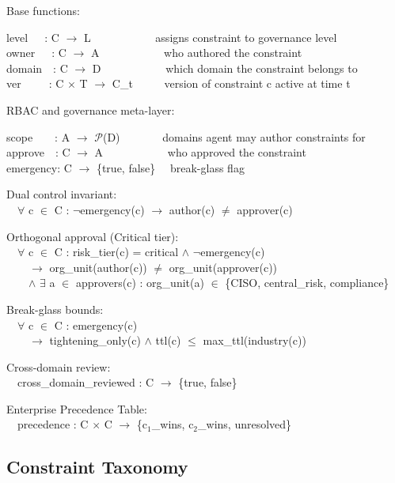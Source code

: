 Base functions:
\begin{cladnote}
level~~~: C $\to$ L~~~~~~~~~~~\textemdash{} assigns constraint to governance level\\
owner~~~: C $\to$ A~~~~~~~~~~~\textemdash{} who authored the constraint\\
domain~~: C $\to$ D~~~~~~~~~~~\textemdash{} which domain the constraint belongs to\\
ver~~~~~: C $\times$ T $\to$ C\_t~~~~~\textemdash{} version of constraint c active at time t
\end{cladnote}


RBAC and governance meta-layer:
\begin{cladnote}
scope~~~~: A $\to$ $\mathcal{P}$(D)~~~~~~~\textemdash{} domains agent may author constraints for\\
approve~~: C $\to$ A~~~~~~~~~~~\textemdash{} who approved the constraint\\
emergency: C $\to$ \{true, false\}~~\textemdash{} break-glass flag
\par\smallskip
Dual control invariant:\\
~~$\forall$ c $\in$ C : $\neg$emergency(c) $\to$ author(c) $\neq$ approver(c)
\par\smallskip
Orthogonal approval (Critical tier):\\
~~$\forall$ c $\in$ C : risk\_tier(c) = critical $\wedge$ $\neg$emergency(c)\\
~~~~$\to$ org\_unit(author(c)) $\neq$ org\_unit(approver(c))\\
~~~~$\wedge$ $\exists$ a $\in$ approvers(c) : org\_unit(a) $\in$ \{CISO, central\_risk, compliance\}
\par\smallskip
Break-glass bounds:\\
~~$\forall$ c $\in$ C : emergency(c)\\
~~~~$\to$ tightening\_only(c) $\wedge$ ttl(c) $\leq$ max\_ttl(industry(c))
\par\smallskip
Cross-domain review:\\
~~cross\_domain\_reviewed : C $\to$ \{true, false\}
\par\smallskip
Enterprise Precedence Table:\\
~~precedence : C $\times$ C $\to$ \{c$_1$\_wins, c$_2$\_wins, unresolved\}
\end{cladnote}


\subsection{Constraint Taxonomy}
\label{sec:formal-model-A-1-4}


